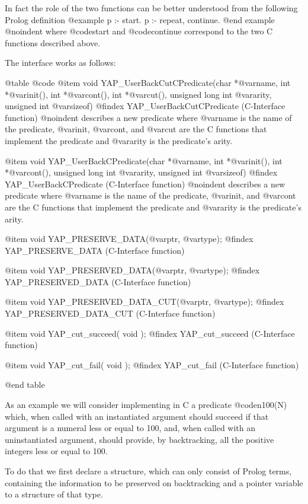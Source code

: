 In fact the role of the two functions can be better understood from the
following Prolog definition
@example
       p :- start.
       p :- repeat,
                continue.
@end example
@noindent
where @code{start} and @code{continue} correspond to the two C functions
described above.

The interface works as follows:

@table @code
 @item   void YAP_UserBackCutCPredicate(char *@var{name}, int *@var{init}(), int *@var{cont}(), int *@var{cut}(), unsigned long int @var{arity}, unsigned int @var{sizeof})
@findex YAP_UserBackCutCPredicate (C-Interface function)
@noindent
describes a new predicate where @var{name} is the name of the predicate,
@var{init}, @var{cont}, and @var{cut} are the C functions that implement
the predicate and @var{arity} is the predicate's arity.

@item   void YAP_UserBackCPredicate(char *@var{name}, int *@var{init}(), int *@var{cont}(), unsigned long int @var{arity}, unsigned int @var{sizeof})
@findex YAP_UserBackCPredicate (C-Interface function)
@noindent
describes a new predicate where @var{name} is the name of the predicate,
@var{init}, and @var{cont} are the C functions that implement the
predicate and @var{arity} is the predicate's arity.

@item   void YAP_PRESERVE_DATA(@var{ptr}, @var{type});
@findex YAP_PRESERVE_DATA (C-Interface function)

@item   void YAP_PRESERVED_DATA(@var{ptr}, @var{type});
@findex YAP_PRESERVED_DATA (C-Interface function)

@item   void YAP_PRESERVED_DATA_CUT(@var{ptr}, @var{type});
@findex YAP_PRESERVED_DATA_CUT (C-Interface function)

@item    void YAP_cut_succeed( void );
@findex YAP_cut_succeed (C-Interface function)

@item    void YAP_cut_fail( void );
@findex YAP_cut_fail (C-Interface function)

@end table



As an example we will consider implementing in C a predicate @code{n100(N)}
which, when called with an instantiated argument should succeed if that
argument is a numeral less or equal to 100, and, when called with an
uninstantiated argument, should provide, by backtracking, all the positive
integers less or equal to 100.

   To do that we first declare a structure, which can only consist
of Prolog terms, containing the information to be preserved on backtracking
and a pointer variable to a structure of that type.

